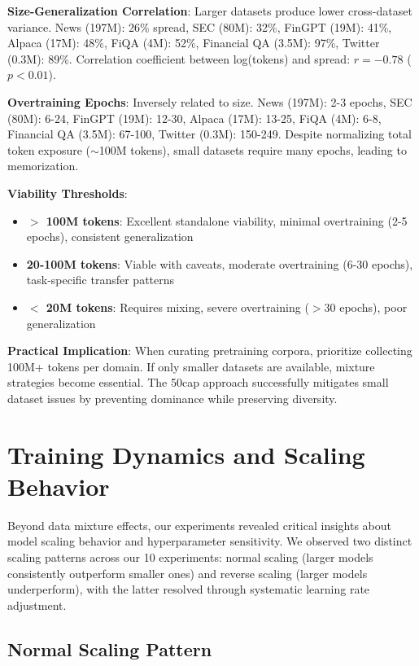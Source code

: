\textbf{Size-Generalization Correlation}: Larger datasets produce lower cross-dataset variance. News (197M): 26\% spread, SEC (80M): 32\%, FinGPT (19M): 41\%, Alpaca (17M): 48\%, FiQA (4M): 52\%, Financial QA (3.5M): 97\%, Twitter (0.3M): 89\%. Correlation coefficient between log(tokens) and spread: $r = -0.78$ ($p < 0.01$).

\textbf{Overtraining Epochs}: Inversely related to size. News (197M): 2-3 epochs, SEC (80M): 6-24, FinGPT (19M): 12-30, Alpaca (17M): 13-25, FiQA (4M): 6-8, Financial QA (3.5M): 67-100, Twitter (0.3M): 150-249. Despite normalizing total token exposure ($\sim$100M tokens), small datasets require many epochs, leading to memorization.

\textbf{Viability Thresholds}:
\begin{itemize}
\item \textbf{$>$ 100M tokens}: Excellent standalone viability, minimal overtraining (2-5 epochs), consistent generalization
\item \textbf{20-100M tokens}: Viable with caveats, moderate overtraining (6-30 epochs), task-specific transfer patterns
\item \textbf{$<$ 20M tokens}: Requires mixing, severe overtraining ($>$30 epochs), poor generalization
\end{itemize}

\textbf{Practical Implication}: When curating pretraining corpora, prioritize collecting 100M+ tokens per domain. If only smaller datasets are available, mixture strategies become essential. The 50cap approach successfully mitigates small dataset issues by preventing dominance while preserving diversity.

\section{Training Dynamics and Scaling Behavior}

Beyond data mixture effects, our experiments revealed critical insights about model scaling behavior and hyperparameter sensitivity. We observed two distinct scaling patterns across our 10 experiments: normal scaling (larger models consistently outperform smaller ones) and reverse scaling (larger models underperform), with the latter resolved through systematic learning rate adjustment.

\subsection{Normal Scaling Pattern}


